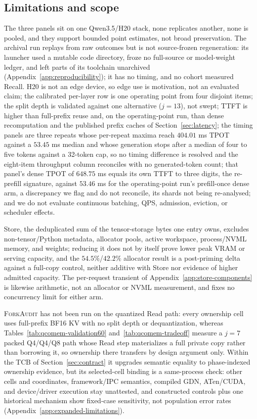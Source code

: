 \documentclass{article}
\newcommand{\method}{\textsc{ForkAudit}}
\begin{document}
\subsection{Limitations and scope}
\label{sec:limitations}

The three panels sit on one Qwen3.5/H20 stack, none replicates another, none is
pooled, and they support bounded point estimates, not broad preservation.  The
archival run replays from raw outcomes but is not
source-frozen regeneration: its launcher used a mutable code directory, froze no
full-source or model-weight ledger, and left parts of its toolchain unarchived
(Appendix~\ref{app:reproducibility}); it has no timing, and no cohort measured
Recall.  H20 is not an edge device, so edge use is motivation, not an evaluated
claim; the calibrated per-layer row is one operating point from four disjoint
items; the split depth is validated against one alternative ($j=13$), not swept;
TTFT is higher than full-prefix reuse and, on the operating-point run, than
dense recomputation and the published prefix caches of
Section~\ref{sec:latency}; the timing panels are three repeats whose per-repeat
maxima reach $404.01$ ms TPOT against a $53.45$ ms median and whose generation
stops after a median of four to five tokens against a 32-token cap, so no timing
difference is resolved and the eight-item throughput column reconciles with no
generated-token count; that panel's dense TPOT of $648.75$ ms equals its own TTFT
to three digits, the re-prefill signature, against $53.46$ ms for the
operating-point run's prefill-once dense arm, a discrepancy we flag and do not
reconcile, its shards not being re-analysed; and we do not evaluate continuous
batching, QPS, admission, eviction, or scheduler effects.

Store, the deduplicated sum of the tensor-storage bytes one entry owns, excludes
non-tensor/Python metadata, allocator pools, active workspace, process/NVML
memory, and weights; reducing it does not by itself prove lower peak VRAM or
serving capacity, and the $54.5\%$/$42.2\%$ allocator result is a post-priming
delta against a full-copy control, neither additive with Store nor evidence of
higher admitted capacity.  The per-request transient of
Appendix~\ref{app:store-components} is likewise arithmetic, not an allocator or
NVML measurement, and fixes no concurrency limit for either arm.

\method{} has not been run on the quantized Read path: every ownership cell uses
full-prefix BF16 KV with no split depth or dequantization, whereas
Tables~\ref{tab:qcomem-validation60} and~\ref{tab:qcomem-tradeoff} measure a
$j=7$ packed Q4/Q4/Q8 path whose Read step materializes a full private copy
rather than borrowing it, so ownership there transfers by design argument only.
Within the TCB of Section~\ref{sec:contract} it upgrades semantic equality to
phase-indexed ownership evidence, but its selected-cell binding is a
same-process check: other cells and coordinates, framework/IPC semantics,
compiled GDN, ATen/CUDA, and device/driver execution stay unattested, and
constructed controls plus one historical mechanism show fixed-case sensitivity,
not population error rates (Appendix~\ref{app:expanded-limitations}).
\end{document}
